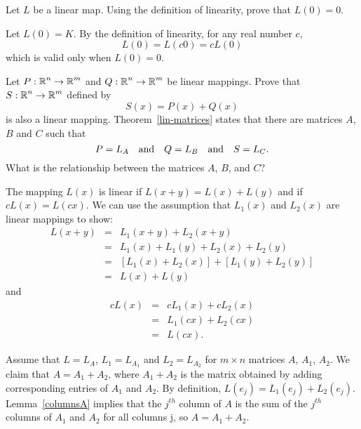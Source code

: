 \documentclass{ximera}
\begin{document}
\begin{exercise} \label{c4.3.11}
Let $L$ be a linear map.  Using the definition of linearity,
prove that $L(0)=0$.

\begin{solution}

Let $L(0) = K$.
By the definition of linearity, for any real number $c$,
\[ L(0) = L(c0) = cL(0) \]
which is valid only when $L(0) = 0$.

\end{solution}
\end{exercise}

\begin{exercise}  \label{c4.3.12}
Let $P:\mbox{$\Bbb{R}$}^n\to\mbox{$\Bbb{R}$}^m$ and $Q:\mbox{$\Bbb{R}$}^n\to\mbox{$\Bbb{R}$}^m$ be linear mappings. Prove
that $S:\mbox{$\Bbb{R}$}^n\to\mbox{$\Bbb{R}$}^m$ defined by
\[
S(x) = P(x) + Q(x)
\]
is also a linear mapping.  Theorem~\ref{lin-matrices} states that there
are matrices $A$, $B$ and $C$ such that
\[
P = L_A \quad\mbox{and}\quad Q = L_B \quad\mbox{and}\quad S = L_C .
\]
What is the relationship between the matrices $A$, $B$, and $C$?

\begin{solution}

The mapping $L(x)$ is linear if $L(x + y) = L(x) + L(y)$ and
if $cL(x) = L(cx)$.  We can use the assumption that $L_1(x)$
and $L_2(x)$ are linear mappings to show:
\[ \begin{array}{rcl}
L(x + y) & = & L_1(x + y) + L_2(x + y) \\
& = & L_1(x) + L_1(y) + L_2(x) + L_2(y) \\
& = & [L_1(x) + L_2(x)] + [L_1(y) + L_2(y)] \\
& = & L(x) + L(y) \end{array} \]
and
\[ \begin{array}{rcl}
cL(x) & = & cL_1(x) + cL_2(x) \\
& = & L_1(cx) + L_2(cx) \\
& = & L(cx). \end{array} \]

Assume that $L = L_A$, $L_1 = L_{A_1}$ and $L_2 = L_{A_2}$ for
$m \times n$ matrices $A$, $A_1$, $A_2$.  We claim that
$A = A_1 + A_2$, where $A_1 + A_2$ is the matrix obtained by
adding corresponding entries of $A_1$ and $A_2$.  By
definition, $L(e_j) = L_1(e_j) + L_2(e_j)$.  Lemma~\ref{columnsA}
implies that the $j^{th}$ column of $A$ is the sum of the
$j^{th}$ columns of $A_1$ and $A_2$ for all columns {j}, so
$A = A_1 + A_2$.

\end{solution}
\end{exercise}
\end{document}
